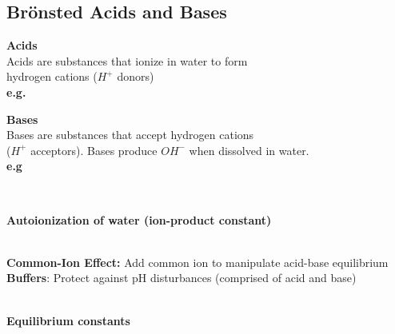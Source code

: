 \subsection{Brönsted Acids and Bases}
\begin{minipage}{0.45\linewidth}
\textbf{Acids}\\
Acids are substances that ionize in water to form \\
hydrogen cations ($H^{+}$ donors)\\
\textbf{e.g.}\\
\end{minipage}
\begin{minipage}{0.45\linewidth}
\textbf{Bases}\\
Bases are substances that accept 
hydrogen cations \\
($H^{+}$ acceptors). Bases produce $OH^{-}$ when dissolved in water.\\
\textbf{e.g}\\
\end{minipage}\\
\begin{minipage}{0.6\linewidth}
\textbf{Autoionization of water (ion-product constant)}\\
\fbox{$K_w = [H_3O^{+}][OH^{-} = [H^{+}][OH^{-}] = 1.0 \cdot 10^{-14}$ (at $25 ^{\circ}C$)}\\    
\end{minipage}
\begin{minipage}{0.30\linewidth}
    \textbf{Common-Ion Effect:} Add common ion to manipulate acid-base equilibrium\\
    \textbf{Buffers}: Protect against pH disturbances (comprised of acid and base)
\end{minipage}\\
\textbf{Equilibrium constants}\\
\begin{minipage}{0.5\linewidth}
\end{minipage}
